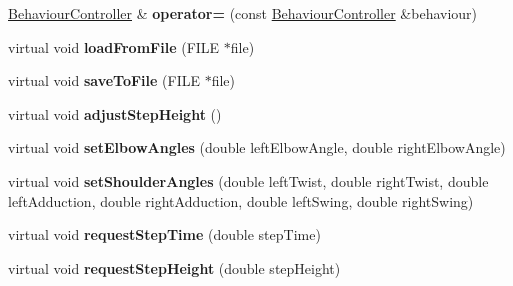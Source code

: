 \begin{DoxyCompactItemize}
\item 
\hypertarget{classCartWheel_1_1Core_1_1BehaviourController_adca068b5514276ec3b15aae8943ae0b7}{
\hyperlink{classCartWheel_1_1Core_1_1BehaviourController}{BehaviourController} \& {\bfseries operator=} (const \hyperlink{classCartWheel_1_1Core_1_1BehaviourController}{BehaviourController} \&behaviour)}
\label{classCartWheel_1_1Core_1_1BehaviourController_adca068b5514276ec3b15aae8943ae0b7}

\item 
\hypertarget{classCartWheel_1_1Core_1_1BehaviourController_ac68f3ece51dc83219437c2e2f0014b58}{
virtual void {\bfseries loadFromFile} (FILE $\ast$file)}
\label{classCartWheel_1_1Core_1_1BehaviourController_ac68f3ece51dc83219437c2e2f0014b58}

\item 
\hypertarget{classCartWheel_1_1Core_1_1BehaviourController_a98a790ce93c5cb7c2f4c3094feb0c1c1}{
virtual void {\bfseries saveToFile} (FILE $\ast$file)}
\label{classCartWheel_1_1Core_1_1BehaviourController_a98a790ce93c5cb7c2f4c3094feb0c1c1}

\item 
\hypertarget{classCartWheel_1_1Core_1_1BehaviourController_a542f16f460e6f2a68f9a238ca9cc64bb}{
virtual void {\bfseries adjustStepHeight} ()}
\label{classCartWheel_1_1Core_1_1BehaviourController_a542f16f460e6f2a68f9a238ca9cc64bb}

\item 
\hypertarget{classCartWheel_1_1Core_1_1BehaviourController_aa3779f87a26367fb6b1cd0ff9db414ad}{
virtual void {\bfseries setElbowAngles} (double leftElbowAngle, double rightElbowAngle)}
\label{classCartWheel_1_1Core_1_1BehaviourController_aa3779f87a26367fb6b1cd0ff9db414ad}

\item 
\hypertarget{classCartWheel_1_1Core_1_1BehaviourController_a8b432992a6191c2b370f925b19e0e376}{
virtual void {\bfseries setShoulderAngles} (double leftTwist, double rightTwist, double leftAdduction, double rightAdduction, double leftSwing, double rightSwing)}
\label{classCartWheel_1_1Core_1_1BehaviourController_a8b432992a6191c2b370f925b19e0e376}

\item 
\hypertarget{classCartWheel_1_1Core_1_1BehaviourController_a700805aad302575a44b5e385f48e0c31}{
virtual void {\bfseries requestStepTime} (double stepTime)}
\label{classCartWheel_1_1Core_1_1BehaviourController_a700805aad302575a44b5e385f48e0c31}

\item 
\hypertarget{classCartWheel_1_1Core_1_1BehaviourController_a20322b30ec599e43b4e62111149a17eb}{
virtual void {\bfseries requestStepHeight} (double stepHeight)}
\label{classCartWheel_1_1Core_1_1BehaviourController_a20322b30ec599e43b4e62111149a17eb}


\end{DoxyCompactItemize}
